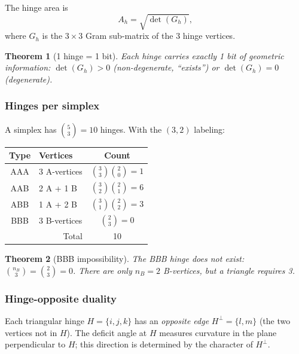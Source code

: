 \documentclass[12pt]{article}
\newtheorem{theorem}{Theorem}[section]
\theoremstyle{remark}
\theoremstyle{definition}
\begin{document}
The hinge area is
\begin{equation}
A_h = \sqrt{\det(G_h)},
\end{equation}
where $G_h$ is the $3 \times 3$ Gram sub-matrix of the 3 hinge vertices.

\begin{theorem}[1 hinge = 1 bit]
\label{thm:hinge_bit}
Each hinge carries exactly 1 bit of geometric information: $\det(G_h) > 0$ (non-degenerate, ``exists'') or $\det(G_h) = 0$ (degenerate).
\end{theorem}

\subsubsection{Hinges per simplex}

A simplex has $\binom{5}{3} = 10$ hinges. With the $(3,2)$ labeling:

\begin{center}
\begin{tabular}{clc}
\hline
Type & Vertices & Count \\
\hline
AAA & 3 A-vertices & $\binom{3}{3}\binom{2}{0} = 1$ \\
AAB & 2 A + 1 B & $\binom{3}{2}\binom{2}{1} = 6$ \\
ABB & 1 A + 2 B & $\binom{3}{1}\binom{2}{2} = 3$ \\
BBB & 3 B-vertices & $\binom{2}{3} = 0$ \\
\hline
\multicolumn{2}{r}{Total} & 10 \\
\hline
\end{tabular}
\end{center}

\begin{theorem}[BBB impossibility]
\label{thm:bbb}
The BBB hinge does not exist: $\binom{n_B}{3} = \binom{2}{3} = 0$. There are only $n_B = 2$ B-vertices, but a triangle requires 3.
\end{theorem}

\subsubsection{Hinge-opposite duality}
\label{sec:hinge_opposite}

Each triangular hinge $H = \{i,j,k\}$ has an \emph{opposite edge} $H^\perp = \{l,m\}$ (the two vertices not in $H$).  The deficit angle at $H$ measures curvature in the plane perpendicular to $H$; this direction is determined by the character of $H^\perp$.
\end{document}
